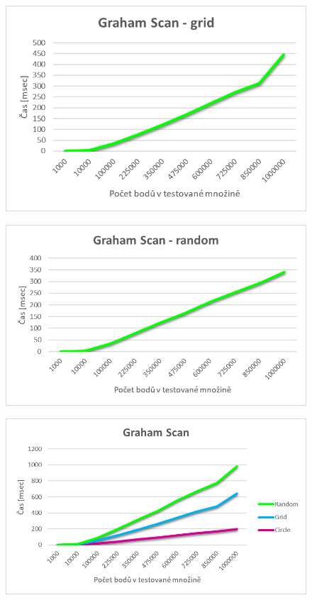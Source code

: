 \documentclass[a4paper, 12pt]{article}
\begin{document}
\begin{figure}[h!]
	\centering
	\includegraphics[width=15cm]{grafy/gs_grid.png}
\end{figure}

\clearpage
\begin{figure}[h!]
	\centering
	\includegraphics[width=15cm]{grafy/gs_random.png}
\end{figure}

\begin{figure}[h!]
	\centering
	\includegraphics[width=15cm]{grafy/gs.png}
\end{figure}
\end{document}
